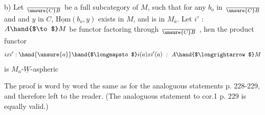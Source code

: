 b) Let $\over{\unsure{C}}{B}$ be a full subcategory of $M$, such that for any $b_o$ in $\over{\unsure{C}}{B}$  and
and $y$ in $C$,  $\underline{\mathrm{Hom}}(b_o,y)$  exists in $M$, and is in $M_a$.  Let $i'$ : $A \hand{$\to$} M$
be  functor factoring through $\over{\unsure{C}}{B}$ , hen the product functor 
\[ ixi' : \hand{\unsure{a}} \hand{$\longmapsto$} i(a)xi'(a) \ : \ A \hand{$\longrightarrow$} M \]
is $M_a$-$\underline{W}$-aspheric 

The proof is word by word the same as for the analoguous statements
p. 228-229, and therefore left to the reader. (The analoguous statement
to cor.1  p. 229 is equally valid.)

